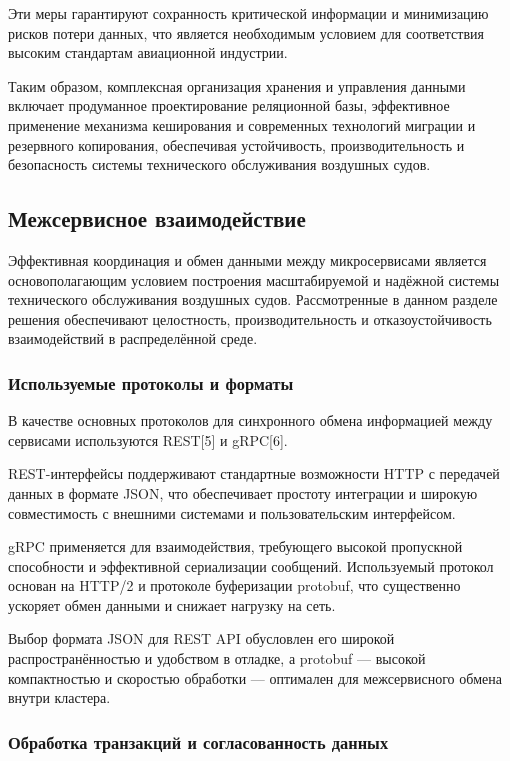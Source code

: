 \documentclass[14pt,a4paper]{extarticle}
\begin{document}
Эти меры гарантируют сохранность критической информации и минимизацию рисков потери данных, что является необходимым условием для соответствия высоким стандартам авиационной индустрии.

Таким образом, комплексная организация хранения и управления данными включает продуманное проектирование реляционной базы, эффективное применение механизма кеширования и современных технологий миграции и резервного копирования, обеспечивая устойчивость, производительность и безопасность системы технического обслуживания воздушных судов.

\subsection{Межсервисное взаимодействие}

Эффективная координация и обмен данными между микросервисами является основополагающим условием построения масштабируемой и надёжной системы технического обслуживания воздушных судов. Рассмотренные в данном разделе решения обеспечивают целостность, производительность и отказоустойчивость взаимодействий в распределённой среде.

\subsubsection{Используемые протоколы и форматы}

В качестве основных протоколов для синхронного обмена информацией между сервисами используются REST[5] и gRPC[6].  

REST-интерфейсы поддерживают стандартные возможности HTTP с передачей данных в формате JSON, что обеспечивает простоту интеграции и широкую совместимость с внешними системами и пользовательским интерфейсом.  

gRPC применяется для взаимодействия, требующего высокой пропускной способности и эффективной сериализации сообщений. Используемый протокол основан на HTTP/2 и протоколе буферизации protobuf, что существенно ускоряет обмен данными и снижает нагрузку на сеть.

Выбор формата JSON для REST API обусловлен его широкой распространённостью и удобством в отладке, а protobuf — высокой компактностью и скоростью обработки — оптимален для межсервисного обмена внутри кластера.

\subsubsection{Обработка транзакций и согласованность данных}
\end{document}
